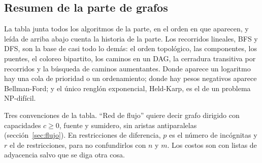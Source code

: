 \documentclass[11pt,letterpaper]{article}
\begin{document}
\subsection*{Resumen de la parte de grafos}

La tabla junta todos los algoritmos de la parte, en el orden en que
aparecen, y leída de arriba abajo cuenta la historia de la parte. Los
recorridos lineales, BFS y DFS, son la base de casi todo lo demás: el
orden topológico, las componentes, los puentes, el coloreo bipartito,
los caminos en un DAG, la cerradura transitiva por recorridos y la
búsqueda de caminos aumentantes. Donde aparece un logaritmo hay una
cola de prioridad o un ordenamiento; donde hay pesos negativos aparece
Bellman-Ford; y el único renglón exponencial, Held-Karp, es el de un
problema NP-difícil.

Tres convenciones de la tabla. ``Red de flujo'' quiere decir grafo
dirigido con capacidades $c \ge 0$, fuente y sumidero, sin aristas
antiparalelas (sección~\ref{sec:flujo}). En restricciones de
diferencia, $p$ es el número de incógnitas y $r$ el de restricciones,
para no confundirlos con $n$ y $m$. Los costos son con listas de
adyacencia salvo que se diga otra cosa.
\end{document}
